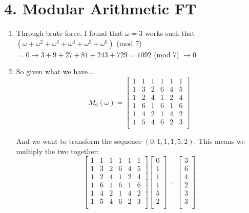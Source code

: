\documentclass[11pt]{article}
\newenvironment{qparts}{\begin{enumerate}[{(}a{)}]}{\end{enumerate}}
\begin{document}
\section*{4. Modular Arithmetic FT}
\begin{qparts}
\item Through brute force, I found that $\omega = 3$ works such that $(\omega + \omega^2 + \omega^3 + \omega^4 + \omega^5 + \omega^6)$ (mod 7) $= 0 \rightarrow 3 + 9 + 27 + 81 + 243 + 729 = 1092$ (mod 7) $\rightarrow 0$
\item So given what we have... 
\[M_6(\omega) =
\begin{bmatrix}
    1       & 1 & 1 & 1 & 1 & 1 \\
    1       & 3 & 2 & 6 & 4 & 5 \\
    1       & 2 & 4 & 1 & 2 & 4 \\
    1       & 6 & 1 & 6 & 1 & 6 \\
    1       & 4 & 2 & 1 & 4 & 2 \\
    1       & 5 & 4 & 6 & 2 & 3 \\
\end{bmatrix}
\]

And we want to transform the sequence $(0, 1, 1, 1, 5, 2)$. This means we multiply the two together:
\[
\begin{bmatrix}
    1       & 1 & 1 & 1 & 1 & 1 \\
    1       & 3 & 2 & 6 & 4 & 5 \\
    1       & 2 & 4 & 1 & 2 & 4 \\
    1       & 6 & 1 & 6 & 1 & 6 \\
    1       & 4 & 2 & 1 & 4 & 2 \\
    1       & 5 & 4 & 6 & 2 & 3 \\
\end{bmatrix}
\begin{bmatrix}
0 \\
1 \\
1 \\
1 \\
5 \\
2 \\
\end{bmatrix} = 
\begin{bmatrix}
3 \\
6 \\
4 \\
2 \\
3 \\
3 \\
\end{bmatrix}
\]


\end{qparts}
\end{document}
